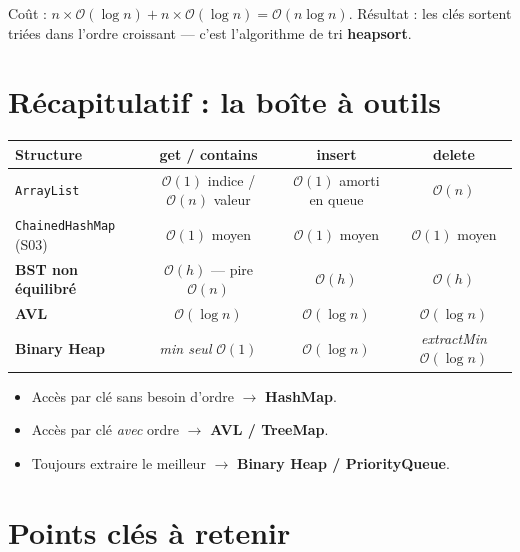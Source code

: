 \documentclass[11pt,a4paper]{article}
\newcommand{\bigO}{\mathcal{O}}
\begin{document}
\begin{appliboxR}[Réponse]
Coût : $n \times \bigO(\log n) + n \times \bigO(\log n) = \bigO(n \log n)$. Résultat : les clés sortent triées dans l'ordre croissant --- c'est l'algorithme de tri \textbf{heapsort}.
\end{appliboxR}

\section{Récapitulatif : la boîte à outils}

\begin{center}
\renewcommand{\arraystretch}{1.3}
\begin{tabular}{@{}lccc@{}}
\toprule
\textbf{Structure} & \textbf{get / contains} & \textbf{insert} & \textbf{delete} \\
\midrule
\texttt{ArrayList}           & $\bigO(1)$ indice / $\bigO(n)$ valeur & $\bigO(1)$ amorti en queue & $\bigO(n)$ \\
\texttt{ChainedHashMap} (S03) & $\bigO(1)$ moyen                     & $\bigO(1)$ moyen           & $\bigO(1)$ moyen \\
\textbf{BST non équilibré}   & $\bigO(h)$ --- pire $\bigO(n)$        & $\bigO(h)$                 & $\bigO(h)$ \\
\textbf{AVL}                 & $\bigO(\log n)$                       & $\bigO(\log n)$            & $\bigO(\log n)$ \\
\textbf{Binary Heap}         & \emph{min seul} $\bigO(1)$            & $\bigO(\log n)$            & \emph{extractMin} $\bigO(\log n)$ \\
\bottomrule
\end{tabular}
\end{center}

\begin{retenirbox}
\begin{itemize}[nosep]
    \item Accès par clé sans besoin d'ordre $\to$ \textbf{HashMap}.
    \item Accès par clé \emph{avec} ordre $\to$ \textbf{AVL / TreeMap}.
    \item Toujours extraire le meilleur $\to$ \textbf{Binary Heap / PriorityQueue}.
\end{itemize}
\end{retenirbox}

\section{Points clés à retenir}
\end{document}
